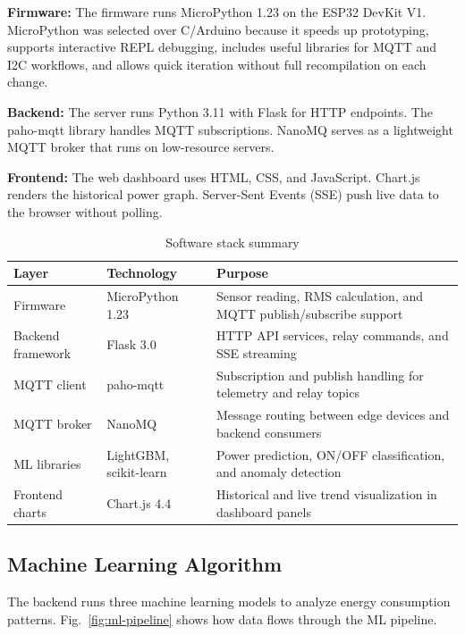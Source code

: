 \documentclass[12pt, a4paper]{article}
\numberwithin{figure}{section}
\numberwithin{table}{section}
\begin{document}
	\textbf{Firmware:} The firmware runs MicroPython 1.23 on the ESP32 DevKit V1. MicroPython was selected over C/Arduino because it speeds up prototyping, supports interactive REPL debugging, includes useful libraries for MQTT and I2C workflows, and allows quick iteration without full recompilation on each change.
	
	\textbf{Backend:} The server runs Python 3.11 with Flask for HTTP endpoints. The paho-mqtt library handles MQTT subscriptions. NanoMQ serves as a lightweight MQTT broker that runs on low-resource servers.
	
	\textbf{Frontend:} The web dashboard uses HTML, CSS, and JavaScript. Chart.js renders the historical power graph. Server-Sent Events (SSE) push live data to the browser without polling.
	
	\begin{table}[H]
		\centering
		\caption{Software stack summary}
		\label{tab:software}
		\vspace{6pt}
		\small
		\begin{tabularx}{\textwidth}{|p{3.0cm}|p{3.1cm}|X|}
			\hline
			\textbf{Layer} & \textbf{Technology} & \textbf{Purpose} \\
			\hline
			Firmware & MicroPython 1.23 & Sensor reading, RMS calculation, and MQTT publish/subscribe support \\
			Backend framework & Flask 3.0 & HTTP API services, relay commands, and SSE streaming \\
			MQTT client & paho-mqtt & Subscription and publish handling for telemetry and relay topics \\
			MQTT broker & NanoMQ & Message routing between edge devices and backend consumers \\
			ML libraries & LightGBM, scikit-learn & Power prediction, ON/OFF classification, and anomaly detection \\
			Frontend charts & Chart.js 4.4 & Historical and live trend visualization in dashboard panels \\
			\hline
		\end{tabularx}
		\normalsize
	\end{table}
	
	\subsection{Machine Learning Algorithm}
	
	The backend runs three machine learning models to analyze energy consumption patterns. Fig.~\ref{fig:ml-pipeline} shows how data flows through the ML pipeline.
	
\end{document}
